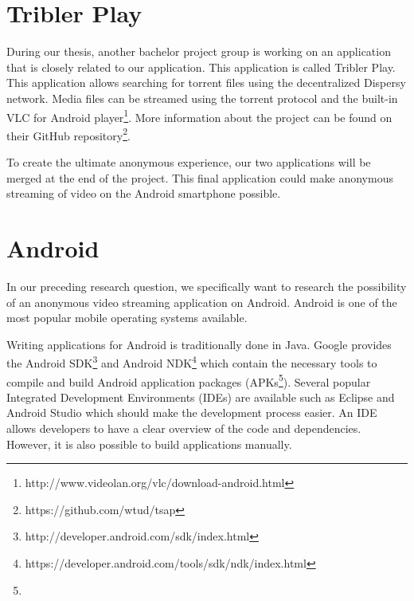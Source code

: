 	\section{Tribler Play}
	\label{sec:triblerplay}
		During our thesis, another bachelor project group is working on an application that is closely related to our application. This application is called Tribler Play. This application allows searching for torrent files using the decentralized Dispersy network. Media files can be streamed using the torrent protocol and the built-in VLC for Android player\footnote{http://www.videolan.org/vlc/download-android.html}. More information about the project can be found on their GitHub repository\footnote{https://github.com/wtud/tsap}.
		
		To create the ultimate anonymous experience, our two applications will be merged at the end of the project. This final application could make anonymous streaming of video on the Android smartphone possible.
		
	\section{Android}
		In our preceding research question, we specifically want to research the possibility of an anonymous video streaming application on Android. Android is one of the most popular mobile operating systems available. 
		
		Writing applications for Android is traditionally done in Java. Google provides the Android SDK\footnote{http://developer.android.com/sdk/index.html} and Android NDK\footnote{https://developer.android.com/tools/sdk/ndk/index.html} which contain the necessary tools to compile and build Android application packages (APKs\footnote{}). Several popular Integrated Development Environments (IDEs) are available such as Eclipse and Android Studio which should make the development process easier. An IDE allows developers to have a clear overview of the code and dependencies. However, it is also possible to build applications manually.